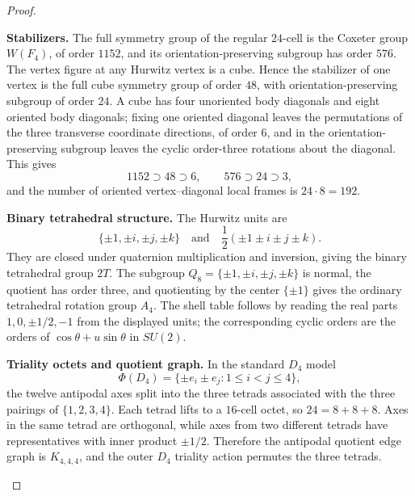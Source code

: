 \documentclass[11pt]{article}
\begin{document}
\begin{proof}

\begin{proofsteps}[label=\textbf{(\roman*)}]
\item \textbf{Stabilizers.}
The full symmetry group of the regular \(24\)-cell is the Coxeter group \(W(F_4)\), of order \(1152\), and its orientation-preserving subgroup has order \(576\).  The vertex figure at any Hurwitz vertex is a cube.  Hence the stabilizer of one vertex is the full cube symmetry group of order \(48\), with orientation-preserving subgroup of order \(24\).  A cube has four unoriented body diagonals and eight oriented body diagonals; fixing one oriented diagonal leaves the permutations of the three transverse coordinate directions, of order \(6\), and in the orientation-preserving subgroup leaves the cyclic order-three rotations about the diagonal.  This gives
\[
1152\supset48\supset6,
\qquad
576\supset24\supset3,
\]
and the number of oriented vertex--diagonal local frames is \(24\cdot8=192\).

\item \textbf{Binary tetrahedral structure.}
The Hurwitz units are
\[
\{\pm1,\pm i,\pm j,\pm k\}
\quad\text{and}\quad
\frac12(\pm1\pm i\pm j\pm k).
\]
They are closed under quaternion multiplication and inversion, giving the binary tetrahedral group \(2T\).  The subgroup \(Q_8=\{\pm1,\pm i,\pm j,\pm k\}\) is normal, the quotient has order three, and quotienting by the center \(\{\pm1\}\) gives the ordinary tetrahedral rotation group \(A_4\).  The shell table follows by reading the real parts \(1,0,\pm1/2,-1\) from the displayed units; the corresponding cyclic orders are the orders of \(\cos\theta+u\sin\theta\) in \(SU(2)\).

\item \textbf{Triality octets and quotient graph.}
In the standard \(D_4\) model
\[
\Phi(D_4)=\{\pm e_i\pm e_j:1\le i<j\le4\},
\]
the twelve antipodal axes split into the three tetrads associated with the three pairings of \(\{1,2,3,4\}\).  Each tetrad lifts to a \(16\)-cell octet, so \(24=8+8+8\).  Axes in the same tetrad are orthogonal, while axes from two different tetrads have representatives with inner product \(\pm1/2\).  Therefore the antipodal quotient edge graph is \(K_{4,4,4}\), and the outer \(D_4\) triality action permutes the three tetrads.


\end{proofsteps}
\end{proof}
\end{document}

